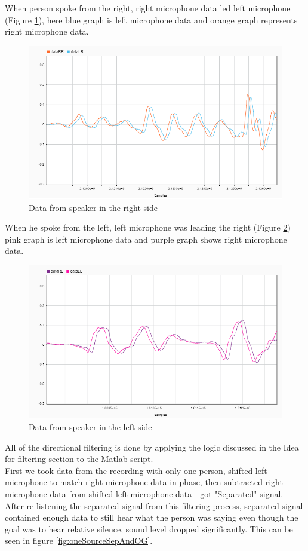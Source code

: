 When person spoke from the right, right microphone data led left microphone (Figure \ref{fig:R}), here blue graph is left microphone data and orange graph represents right microphone data.\\
\begin{figure}[htp]
  \centering
  \includegraphics[width=0.75\linewidth]{Illustrations/DataR.png}
  \caption{Data from speaker in the right side}
  \label{fig:R}
\end{figure}

When he spoke from the left, left microphone was leading the right (Figure \ref{fig:L}) pink graph is left microphone data and purple graph shows right microphone data.
\begin{figure}[htp]
  \centering
  \includegraphics[width=0.75\linewidth]{Illustrations/DataL.png}
  \caption{Data from speaker in the left side}
  \label{fig:L}
\end{figure}

All of the directional filtering is done by applying the logic discussed in the Idea for filtering section to 
the Matlab script.\\
First we took data from the recording with only one person, shifted left microphone to match right microphone 
data in phase, then subtracted right microphone data from shifted left microphone data - got "Separated" signal.\\
After re-listening the separated signal from this filtering process, separated signal contained enough data to 
still hear what the person was saying even though the goal was to hear relative silence, sound level dropped 
significantly. This can be seen in figure \ref{fig:oneSourceSepAndOG}.

